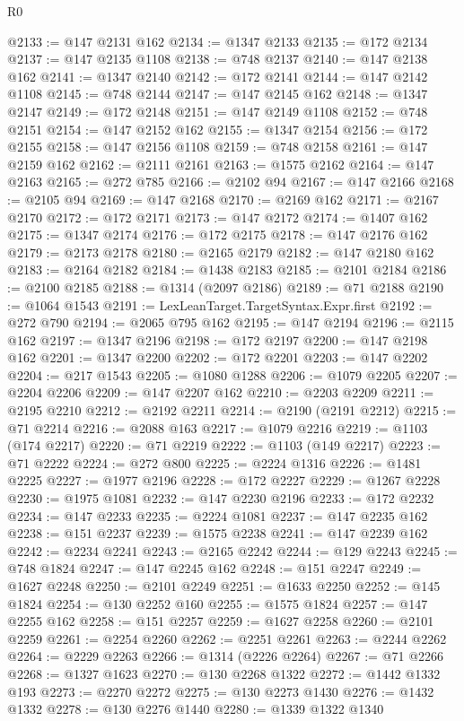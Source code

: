 \begin{lexlean}{R0}
\begin{coremodule}
@2133 := @147 @2131 @162
@2134 := @1347 @2133
@2135 := @172 @2134
@2137 := @147 @2135 @1108
@2138 := @748 @2137
@2140 := @147 @2138 @162
@2141 := @1347 @2140
@2142 := @172 @2141
@2144 := @147 @2142 @1108
@2145 := @748 @2144
@2147 := @147 @2145 @162
@2148 := @1347 @2147
@2149 := @172 @2148
@2151 := @147 @2149 @1108
@2152 := @748 @2151
@2154 := @147 @2152 @162
@2155 := @1347 @2154
@2156 := @172 @2155
@2158 := @147 @2156 @1108
@2159 := @748 @2158
@2161 := @147 @2159 @162
@2162 := @2111 @2161
@2163 := @1575 @2162
@2164 := @147 @2163
@2165 := @272 @785
@2166 := @2102 @94
@2167 := @147 @2166
@2168 := @2105 @94
@2169 := @147 @2168
@2170 := @2169 @162
@2171 := @2167 @2170
@2172 := @172 @2171
@2173 := @147 @2172
@2174 := @1407 @162
@2175 := @1347 @2174
@2176 := @172 @2175
@2178 := @147 @2176 @162
@2179 := @2173 @2178
@2180 := @2165 @2179
@2182 := @147 @2180 @162
@2183 := @2164 @2182
@2184 := @1438 @2183
@2185 := @2101 @2184
@2186 := @2100 @2185
@2188 := @1314 (@2097 @2186)
@2189 := @71 @2188
@2190 := @1064 @1543
@2191 := LexLeanTarget.TargetSyntax.Expr.first
@2192 := @272 @790
@2194 := @2065 @795 @162
@2195 := @147 @2194
@2196 := @2115 @162
@2197 := @1347 @2196
@2198 := @172 @2197
@2200 := @147 @2198 @162
@2201 := @1347 @2200
@2202 := @172 @2201
@2203 := @147 @2202
@2204 := @217 @1543
@2205 := @1080 @1288
@2206 := @1079 @2205
@2207 := @2204 @2206
@2209 := @147 @2207 @162
@2210 := @2203 @2209
@2211 := @2195 @2210
@2212 := @2192 @2211
@2214 := @2190 (@2191 @2212)
@2215 := @71 @2214
@2216 := @2088 @163
@2217 := @1079 @2216
@2219 := @1103 (@174 @2217)
@2220 := @71 @2219
@2222 := @1103 (@149 @2217)
@2223 := @71 @2222
@2224 := @272 @800
@2225 := @2224 @1316
@2226 := @1481 @2225
@2227 := @1977 @2196
@2228 := @172 @2227
@2229 := @1267 @2228
@2230 := @1975 @1081
@2232 := @147 @2230 @2196
@2233 := @172 @2232
@2234 := @147 @2233
@2235 := @2224 @1081
@2237 := @147 @2235 @162
@2238 := @151 @2237
@2239 := @1575 @2238
@2241 := @147 @2239 @162
@2242 := @2234 @2241
@2243 := @2165 @2242
@2244 := @129 @2243
@2245 := @748 @1824
@2247 := @147 @2245 @162
@2248 := @151 @2247
@2249 := @1627 @2248
@2250 := @2101 @2249
@2251 := @1633 @2250
@2252 := @145 @1824
@2254 := @130 @2252 @160
@2255 := @1575 @1824
@2257 := @147 @2255 @162
@2258 := @151 @2257
@2259 := @1627 @2258
@2260 := @2101 @2259
@2261 := @2254 @2260
@2262 := @2251 @2261
@2263 := @2244 @2262
@2264 := @2229 @2263
@2266 := @1314 (@2226 @2264)
@2267 := @71 @2266
@2268 := @1327 @1623
@2270 := @130 @2268 @1322
@2272 := @1442 @1332 @193
@2273 := @2270 @2272
@2275 := @130 @2273 @1430
@2276 := @1432 @1332
@2278 := @130 @2276 @1440
@2280 := @1339 @1322 @1340

\end{coremodule}
\end{lexlean}
